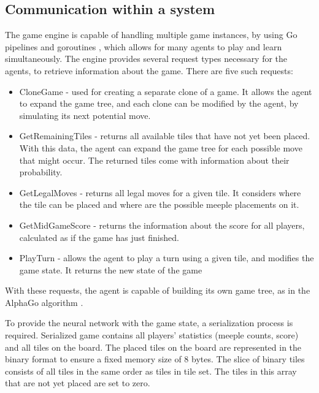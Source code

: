 \subsection{Communication within a system}

The game engine is capable of handling multiple game instances, by using Go pipelines and goroutines \cite{GolangPipeline}, which allows for many agents to play and learn simultaneously. The engine provides several request types necessary for the agents, to retrieve information about the game. There are five such requests:
\begin{itemize}
    \item CloneGame - used for creating a separate clone of a game. It allows the agent to expand the game tree, and each clone can be modified by the agent, by simulating its next potential move.
    \item GetRemainingTiles - returns all available tiles that have not yet been placed. With this data, the agent can expand the game tree for each possible move that might occur. The returned tiles come with information about their probability.
    \item GetLegalMoves - returns all legal moves for a given tile. It considers where the tile can be placed and where are the possible meeple placements on it.
    \item GetMidGameScore - returns the information about the score for all players, calculated as if the game has just finished.
    \item PlayTurn - allows the agent to play a turn using a given tile, and modifies the game state. It returns the new state of the game 
\end{itemize}

With these requests, the agent is capable of building its own game tree, as in the AlphaGo algorithm \cite{AlphaGoAlgorithm}.

To provide the neural network with the game state, a serialization process is required. Serialized game contains all players' statistics (meeple counts, score) and all tiles on the board. The placed tiles on the board are represented in the binary format to ensure a fixed memory size of 8 bytes. The slice of binary tiles consists of all tiles in the same order as tiles in tile set. The tiles in this array that are not yet placed are set to zero.
